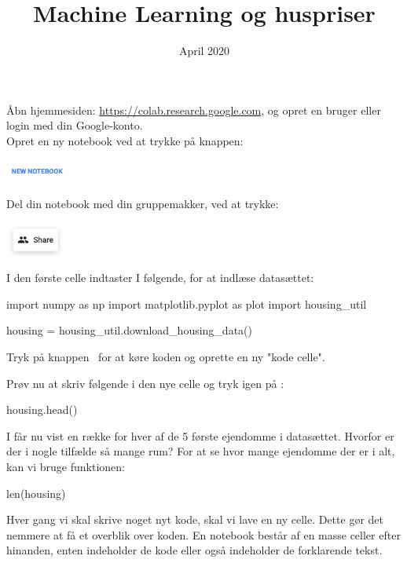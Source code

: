 \documentclass{ucph-handout}
\title{Machine Learning og huspriser}
\date{April 2020}
\newcommand{\inlinegraphics}[1]{\raisebox{-.3\height}{\texttt{[image: \#1]}}}
\newcommand{\runbutton}{\inlinegraphics{images/run_button.png}}
\begin{document}
\begin{exercisebox}[adjusted title=Åbn ny Notebook]

Åbn hjemmesiden: \url{https://colab.research.google.com}, og opret en bruger eller login med din Google-konto.\\

Opret en ny notebook ved at trykke på knappen: 

\quad \includegraphics[height=2em]{images/colab_new_notebook_button}

Del din notebook med din gruppemakker, ved at trykke:

\quad\includegraphics[height=3em]{images/colab_share_button.png}

I den første celle indtaster I følgende, for at indlæse datasættet:
\begin{python}
import numpy as np
import matplotlib.pyplot as  plot
import housing_util

housing = housing_util.download_housing_data()
\end{python}

Tryk på knappen \runbutton\ for at køre koden og oprette en ny "kode celle".




Prøv nu at skriv følgende i den nye celle og tryk igen på \runbutton :
\begin{python}
housing.head()
\end{python}
I får nu vist en række for hver af de 5 første ejendomme i datasættet. 
Hvorfor er der i nogle tilfælde så mange rum?
\newline
\newline
For at se hvor mange ejendomme der er i alt, kan vi bruge  funktionen:
\begin{python}
len(housing)
\end{python}
Hver gang vi skal skrive noget nyt kode, skal vi lave en ny celle. Dette gør det nemmere at få et overblik over koden.
En notebook består af en masse celler efter hinanden, enten indeholder de kode eller også indeholder de forklarende tekst.\newline


\end{exercisebox}
\end{document}

